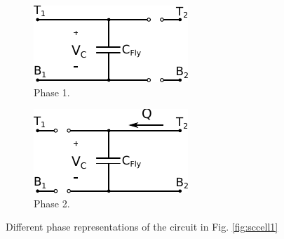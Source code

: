 	\begin{figure}
		\begin{subfigure}{0.4\linewidth}
			\centering
			\includegraphics[width=\linewidth]{4Terminal/Figures/Phase1.pdf}
			\caption{Phase 1.}
			\label{fig:Phase1}
		\end{subfigure}
		\hfill
		\begin{subfigure}{0.4\linewidth}
			\centering
			\includegraphics[width=\linewidth]{4Terminal/Figures/Phase2.pdf}
			\caption{Phase 2.}
			\label{fig:Phase2}
		\end{subfigure}
		\caption{Different phase representations of the circuit in Fig. \ref{fig:sccell1}}
	\end{figure}
	
